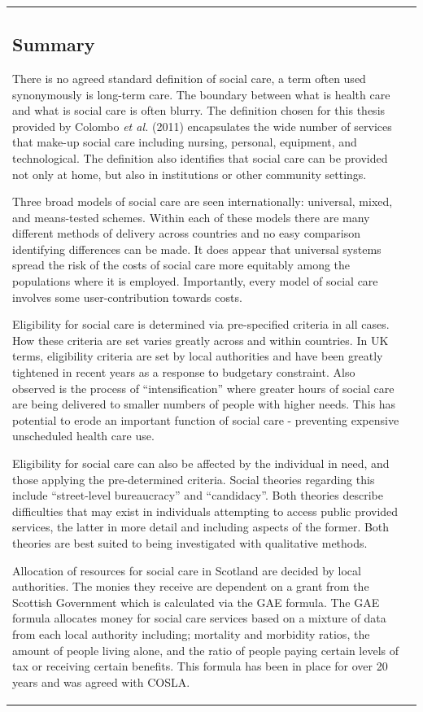 \documentclass[12pt,a4paper,oneside,table]{report}
\begin{document}
\begin{tabular}[t]{ll}
\subsection{Summary}\label{subsec:access-sc-summary}

There is no agreed standard definition of social care, a term often used
synonymously is long-term care. The boundary between what is health care
and what is social care is often blurry. The definition chosen for this
thesis provided by Colombo \textit{et al.} (2011) encapsulates the wide
number of services that make-up social care including nursing, personal,
equipment, and technological. The definition also identifies that social
care can be provided not only at home, but also in institutions or other
community settings.

Three broad models of social care are seen internationally: universal,
mixed, and means-tested schemes. Within each of these models there are
many different methods of delivery across countries and no easy
comparison identifying differences can be made. It does appear that
universal systems spread the risk of the costs of social care more
equitably among the populations where it is employed. Importantly, every
model of social care involves some user-contribution towards costs.

Eligibility for social care is determined via pre-specified criteria in
all cases. How these criteria are set varies greatly across and within
countries. In UK terms, eligibility criteria are set by local
authorities and have been greatly tightened in recent years as a
response to budgetary constraint. Also observed is the process of
``intensification'' where greater hours of social care are being
delivered to smaller numbers of people with higher needs. This has
potential to erode an important function of social care - preventing
expensive unscheduled health care use.

Eligibility for social care can also be affected by the individual in
need, and those applying the pre-determined criteria. Social theories
regarding this include ``street-level bureaucracy'' and ``candidacy''.
Both theories describe difficulties that may exist in individuals
attempting to access public provided services, the latter in more detail
and including aspects of the former. Both theories are best suited to
being investigated with qualitative methods.

Allocation of resources for social care in Scotland are decided by local
authorities. The monies they receive are dependent on a grant from the
Scottish Government which is calculated via the GAE formula. The GAE
formula allocates money for social care services based on a mixture of
data from each local authority including; mortality and morbidity
ratios, the amount of people living alone, and the ratio of people
paying certain levels of tax or receiving certain benefits. This formula
has been in place for over 20 years and was agreed with COSLA.


\end{tabular}
\end{document}
